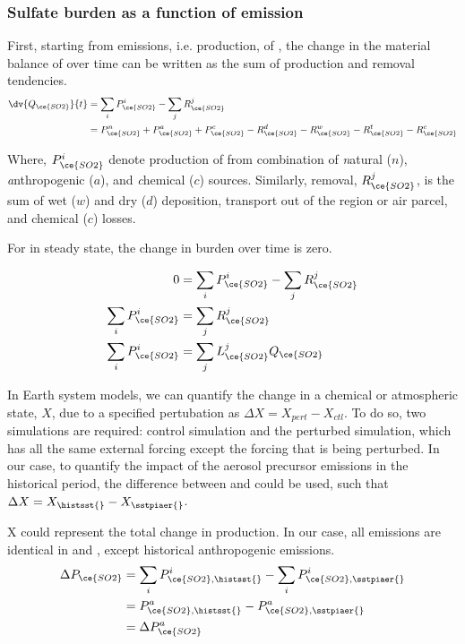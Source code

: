 \subsubsection*{Sulfate burden as a function of  emission}

First, starting from emissions, i.e. production, of , the change in the material balance of  over time can be written as the sum of production and removal tendencies.
\begin{align}
    \dv{Q_{\ce{SO2}}}{t} 
    & = \sum_i P_{\ce{SO2}}^i - \sum_j R_{\ce{SO2}}^j  \\
    &= P_{\ce{SO2}}^n + P_{\ce{SO2}}^a + P_{\ce{SO2}}^c 
    - R_{\ce{SO2}}^d - R_{\ce{SO2}}^w - R_{\ce{SO2}}^t - R_{\ce{SO2}}^c  
\end{align}

Where, $P_{\ce{SO2}}^i$ denote production of  from combination of \textit{n}atural ($n$), \textit{a}nthropogenic ($a$), and \textit{c}hemical ($c$) sources. Similarly,  removal, $R_{\ce{SO2}}^j$, is the sum of wet ($w$) and dry ($d$) deposition, transport out of the region or air parcel, and chemical ($c$) losses.

For  in steady state, the change in  burden over time is zero.

\begin{align}
    0 & = \sum_i P_{\ce{SO2}}^i - \sum_j R_{\ce{SO2}}^j \\
    \sum_i P_{\ce{SO2}}^i &= \sum_j R_{\ce{SO2}}^j \\
    \sum_i P_{\ce{SO2}}^i &= \sum_j L_{\ce{SO2}}^j Q_{\ce{SO2}} \label{ch5:eq:dq/dt} 
\end{align}

In Earth system models, we can quantify the change in a chemical or atmospheric state, $X$, due to a specified pertubation as $\Delta X = X_{pert} - X_{ctl}$. To do so, two simulations are required: control simulation and the perturbed simulation, which has all the same external forcing except the forcing that is being perturbed. In our case, to quantify the impact of the aerosol precursor emissions in the historical period, the difference between \histsst{} and \sstpiaer{} could be used, such that $\Delta X = X_{\text{\histsst{}}}-X_{\text{\sstpiaer{}}}$. 

X could represent the total change in  production. In our case, all  emissions are identical in \histsst{} and \sstpiaer{}, except historical anthropogenic emissions.  
\begin{align}
    \Delta P_{\ce{SO2}}
    & = \sum_i P_{\ce{SO2}, \text{\histsst{}}}^i - \sum_i P_{\ce{SO2}, \text{\sstpiaer{}}}^i \\
    & = P_{\ce{SO2}, \text{\histsst{}}}^a - P_{\ce{SO2}, \text{\sstpiaer{}}}^a \\
    & = \Delta P_{\ce{SO2}}^a \label{ch5:eq:Dp=Dpa}
\end{align}

